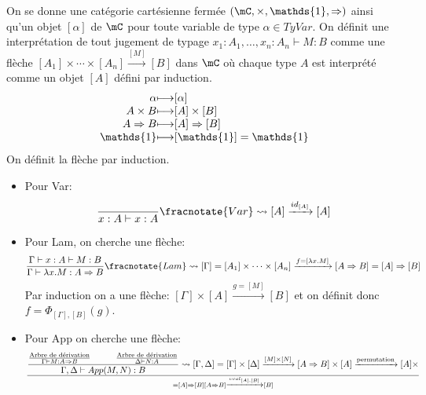 \documentclass[math, info]{cours}
\begin{document}
\begin{definition}[Typage]
	On se donne une catégorie cartésienne fermée $\left( \mC, \times, \mathds{1}, \Rightarrow \right)$ ainsi qu'un objet $[\alpha]$ de $\mC$ pour toute variable de type $\alpha \in TyVar$.
	On définit une interprétation de tout jugement de typage $x_{1}:A_{1}, \ldots, x_{n}:A_{n}\vdash M: B$ comme une flèche $[A_{1}]\times \cdots \times [A_{n}] \xrightarrow{[M]}[B]$ dans $\mC$ où chaque type $A$ est interprété comme un objet $[A]$ défini par induction.
	\begin{equation*}
		\begin{array}[]{r@{\longmapsto}l}
			\alpha & [\alpha]\\
			A\times B & [A]\times [B]\\
			A\Rightarrow B & [A]\Rightarrow [B]\\
			\mathds{1} & [\mathds{1}] = \mathds{1}
		\end{array}
	\end{equation*}
	On définit la flèche par induction.
	\begin{itemize}
		\item Pour Var:
			\begin{equation*}
				\frac{}{x:A\vdash x: A}\fracnotate{Var} \rightsquigarrow [A]\xrightarrow{id_{[A]}}[A]
			\end{equation*}
		\item Pour Lam, on cherche une flèche:
			\begin{equation*}
				\frac{\Gamma\vdash x: A\vdash M: B}{\Gamma\vdash \lambda x.M: A\Rightarrow B}\fracnotate{Lam}\rightsquigarrow [\Gamma] = [A_{1}] \times \cdots \times [A_{n}] \xrightarrow{f = [\lambda x. M]} [A\Rightarrow B] = [A]\Rightarrow [B]
			\end{equation*}
			Par induction on a une flèche: $[\Gamma]\times [A] \xrightarrow{g = [M]} [B]$ et on définit donc $f = \Phi_{[\Gamma], [B]}(g)$.
		\item Pour App on cherche une flèche:
			\begin{equation*}
				\frac{\frac{\text{Arbre de dérivation}}{\Gamma\vdash M: A\Rightarrow B}\hspace{1cm} \frac{\text{Arbre de dérivation}}{\Delta\vdash N: A}}{\Gamma, \Delta\vdash App(M, N): B} \rightsquigarrow [\Gamma, \Delta] = [\Gamma] \times [\Delta] \xrightarrow{[M] \times [N]} [A\Rightarrow B]\times [A] \xrightarrow{\text{permutation}} [A]\times \over{= [A] \Rightarrow [B]}{[A\Rightarrow B]} \xrightarrow{eval_{[A], [B]}} [B]
			\end{equation*}

\end{itemize}
\end{definition}
\end{document}
